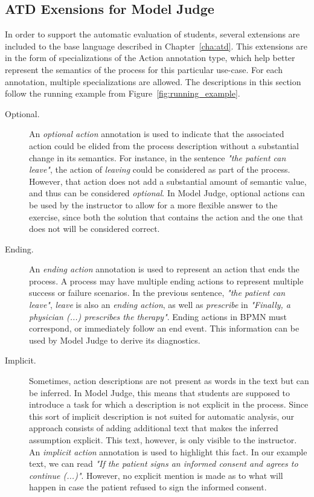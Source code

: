 \subsection{ATD Exensions for Model Judge}
\label{sec:new_annotation_types}

In order to support the automatic evaluation of students, several extensions are
included to the base language described in Chapter~\ref{cha:atd}. This
extensions are in the form of specializations of the Action annotation type,
which help better represent the semantics of the process for this particular
use-case. For each annotation, multiple specializations are allowed. The
descriptions in this section follow the running example from
Figure~\ref{fig:running_example}.

\begin{description}
\item[Optional.]{An \emph{optional action} annotation is used to indicate that
    the associated action could be elided from the process description without a
    substantial change in its semantics. For instance, in the sentence
    \emph{"the patient can leave"}, the action of \emph{leaving} 
    could be considered as part of the process. However, that action does not
    add a substantial amount of semantic value, and thus can be considered
    \emph{optional}. In Model Judge, optional actions can be used by the
    instructor to allow for a more flexible answer to the exercise, since both
    the solution that contains the action and the one that does not will be
    considered correct.}
  
\item[Ending.]{An \emph{ending action} annotation is used to represent an action
    that ends the process. A process may have multiple ending actions to
    represent multiple success or failure scenarios. In the previous sentence,
    \emph{"the patient can leave"}, \emph{leave} is also an
    \emph{ending action}, as well as \emph{prescribe} in \emph{"Finally, a
      physician (...) prescribes the therapy"}. Ending actions in BPMN must
    correspond, or immediately follow an end event. This information can be used
    by Model Judge to derive its diagnostics.}

\item[Implicit.]{Sometimes, action descriptions are not present as words in the
    text but can be inferred. In Model Judge, this means that students are
    supposed to introduce a task for which a description is not explicit in the
    process. Since this sort of implicit description is not suited for automatic
    analysis, our approach consists of adding additional text that makes the
    inferred assumption explicit. This text, however, is only visible to the
    instructor. An \emph{implicit action} annotation is used to highlight this
    fact. In our example text, we can read \emph{"If the patient signs an
      informed consent and  agrees to continue (...)"}. However, no explicit
    mention is made as to what will happen in case the patient refused to sign
    the informed consent.}
\end{description}
    
